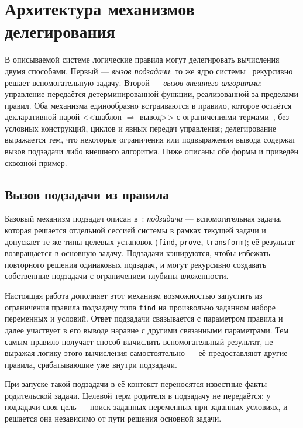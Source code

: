 \documentclass{intsys}
\begin{document}
\section{Архитектура механизмов делегирования}

В описываемой системе логические правила могут делегировать
вычисления двумя способами. Первый --- \emph{вызов подзадачи}: то
же ядро системы~\cite{IS-Annenkov2026} рекурсивно решает вспомогательную
задачу. Второй
--- \emph{вызов внешнего алгоритма}: управление передаётся
детерминированной функции, реализованной за пределами правил. Оба
механизма единообразно встраиваются в правило, которое остаётся
декларативной парой <<шаблон $\Rightarrow$ вывод>> с
ограничениями-термами~\cite{IS-Annenkov2026}, без условных конструкций,
циклов и явных передач управления; делегирование выражается тем,
что некоторые ограничения или подвыражения вывода содержат вызов
подзадачи либо внешнего алгоритма. Ниже описаны обе формы и приведён сквозной
пример.

\subsection{Вызов подзадачи из правила}

Базовый механизм подзадач описан в~\cite{IS-Annenkov2026}:
\emph{подзадача} --- вспомогательная задача, которая решается
отдельной сессией системы в рамках текущей задачи и допускает те же
типы целевых установок (\texttt{find}, \texttt{prove},
\texttt{transform}); её результат возвращается в основную задачу.
Подзадачи кэшируются, чтобы избежать повторного решения одинаковых
подзадач, и могут рекурсивно создавать собственные подзадачи с
ограничением глубины вложенности.

Настоящая работа дополняет этот механизм возможностью запустить из
ограничения правила подзадачу типа \texttt{find} на произвольно
заданном наборе переменных и условий. Ответ подзадачи связывается с
параметром правила и далее участвует в его выводе наравне с другими
связанными параметрами. Тем самым правило получает способ вычислить
вспомогательный результат, не выражая логику этого вычисления
самостоятельно --- её предоставляют другие правила, срабатывающие
уже внутри подзадачи.

При запуске такой подзадачи в её контекст переносятся известные
факты родительской задачи. Целевой терм родителя в подзадачу не
передаётся: у подзадачи своя цель --- поиск заданных переменных при
заданных условиях, и решается она независимо от пути решения
основной задачи.
\end{document}
